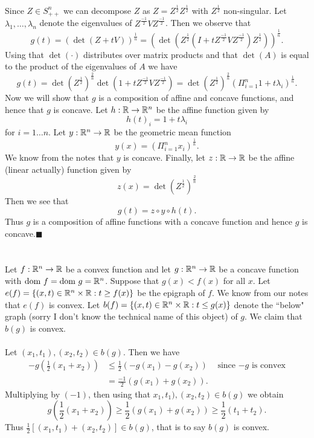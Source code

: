 \documentclass[letterpaper,12pt,oneside,onecolumn]{article}
\begin{document}
\paragraph{}
Since $Z \in S^n_{++}$ we can decompose $Z$ as $Z=Z^\frac{1}{2}Z^\frac{1}{2}$ with $Z^\frac{1}{2}$ non-singular. Let $\lambda_1, \dots, \lambda_n$ denote the eigenvalues of $Z^\frac{-1}{2}VZ^\frac{-1}{2}$. Then we observe that
$$g(t) = (\det(Z+tV))^\frac{1}{n} = (\det(Z^\frac{1}{2}(I + tZ^\frac{-1}{2}VZ^\frac{-1}{2})Z^\frac{1}{2}))^\frac{1}{n}.$$
Using that $\det(\cdot)$ distributes over matrix products and that $\det(A)$ is equal to the product of the eigenvalues of $A$ we have
$$g(t) = \det(Z^\frac{1}{2})^\frac{2}{n}\det(1 + tZ^\frac{-1}{2}VZ^\frac{-1}{2}) = \det(Z^\frac{1}{2})^\frac{2}{n}(\Pi_{i=1}^n 1+t\lambda_i)^\frac{1}{n}.$$
Now we will show that $g$ is a composition of affine and concave functions, and hence that $g$ is concave. Let $h : \mathbb{R} \rightarrow \mathbb{R}^n$ be the affine function given by
$$h(t)_i = 1+t\lambda_i$$
for $i = 1\dots n$. Let $ y : \mathbb{R}^n \rightarrow \mathbb{R}$ be the geometric mean function
$$y(x) = (\Pi_{i=1}^n x_i)^\frac{1}{n}.$$
We know from the notes that $y$ is concave. Finally, let $z: \mathbb{R}\rightarrow \mathbb{R}$ be the affine (linear actually) function given by
$$z(x) = \det(Z^\frac{1}{2})^\frac{2}{n}$$
Then we see that
$$g(t) = z\circ y\circ h(t).$$
Thus $g$ is a composition of affine functions with a concave function and hence $g$ is concave.$\blacksquare$
\section{}
\paragraph{}
Let $f : \mathbb{R}^n \rightarrow \mathbb{R}$ be a convex function and let $g : \mathbb{R}^n \rightarrow \mathbb{R}$ be a concave function with $\text{dom } f = \text{dom } g = \mathbb{R}^n$. Suppose that $g(x) < f(x)$ for all $x$. Let $e(f) = \{(x,t) \in \mathbb{R}^n \times \mathbb{R}: t \geq f(x) \}$ be the epigraph of $f$. We know from our notes that $e(f)$ is convex. Let $b(f) = \{(x,t) \in \mathbb{R}^n \times \mathbb{R}: t \leq g(x)\}$ denote the ``below" graph (sorry I don't know the technical name of this object) of $g$. We claim that $b(g)$ is convex.
\paragraph{}
Let $(x_1, t_1), (x_2, t_2) \in b(g)$. Then we have
\begin{align*}
-g(\frac{1}{2}(x_1 + x_2)) &\leq \frac{1}{2}(-g(x_1) - g(x_2)) &\text{ since $-g$ is convex} \\
&=\frac{-1}{2}(g(x_1) + g(x_2)).
\end{align*}
Multiplying by $(-1)$, then using that $x_1, t_1), (x_2, t_2) \in b(g)$ we obtain
$$g(\frac{1}{2}(x_1 + x_2)) \geq \frac{1}{2}(g(x_1) + g(x_2)) \geq \frac{1}{2}(t_1 + t_2).$$
Thus $\frac{1}{2}[(x_1,t_1) + (x_2,t_2)] \in b(g)$, that is to say $b(g)$ is convex.
\end{document}
